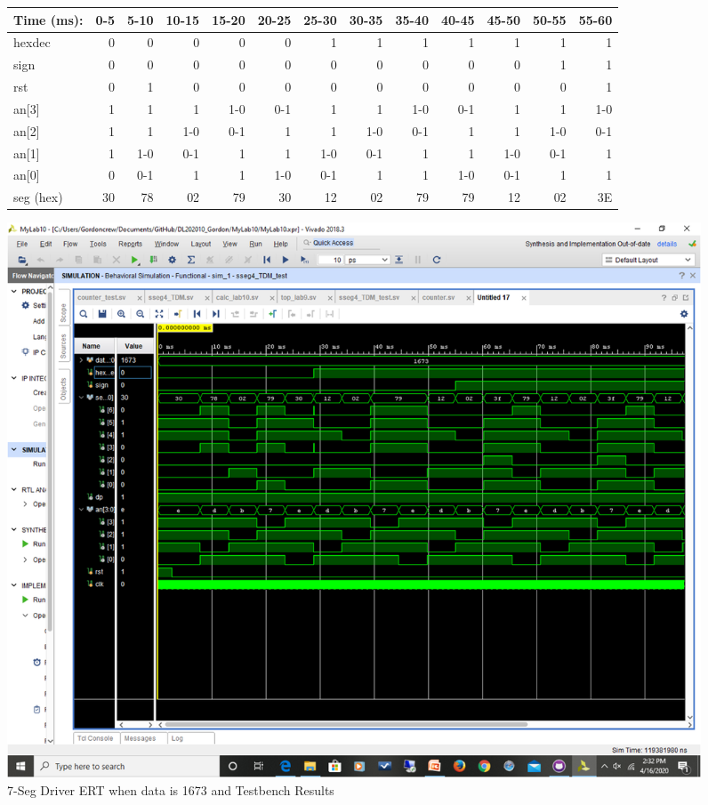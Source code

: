 \documentclass[11pt]{article}
\begin{document}
\begin{figure}[ht]\centering
	\begin{tabular}{l|rrrrrrrrrrrr}
		Time (ms): & 0-5 & 5-10 & 10-15 & 15-20 & 20-25 & 25-30 & 30-35 & 35-40 & 40-45 & 45-50 & 50-55 & 55-60  \\
		\midrule 
		hexdec & 0 & 0 & 0 & 0 & 0 & 1 & 1 & 1 & 1 & 1 & 1 & 1  \\
		sign & 0 & 0 & 0 & 0 & 0 & 0 & 0 & 0 & 0 & 0 & 1 & 1  \\
		rst & 0 & 1 & 0 & 0 & 0 & 0 & 0 & 0 & 0 & 0 & 0 & 1  \\
		\midrule
		an[3] & 1 & 1 & 1 & 1-0 & 0-1 & 1 & 1 & 1-0 & 0-1 & 1 & 1 & 1-0 \\
		an[2] & 1 & 1 & 1-0 & 0-1 & 1 & 1 & 1-0 & 0-1 & 1 & 1 & 1-0 & 0-1\\
		an[1] & 1 & 1-0 & 0-1 & 1 & 1 & 1-0 & 0-1 & 1 & 1 & 1-0 & 0-1 & 1\\
		an[0] & 0 & 0-1 & 1 & 1 & 1-0 & 0-1 & 1 & 1 & 1-0 & 0-1 & 1 & 1  \\
		seg (hex) & 30 & 78 & 02 & 79 & 30 & 12 & 02 & 79 & 79 & 12 & 02 & 3E \\
		\bottomrule
	\end{tabular}\medskip
	
	\includegraphics[width=1.15\textwidth, trim=2cm 5.5cm 2cm 4.0cm,clip]{ssegtest.png}
	\caption{7-Seg Driver ERT when data is 1673 and Testbench Results}
	\label{fig:sim_with_table}
\end{figure}


\clearpage
\end{document}
